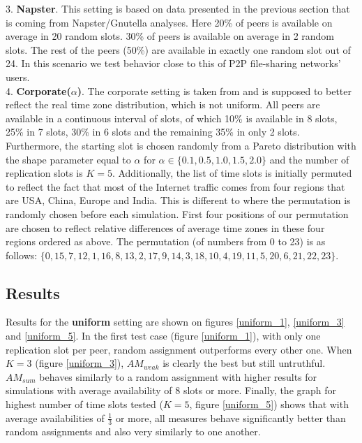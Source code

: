 \documentclass{pracamgren}
\begin{document}
3. {\bf Napster}. This setting is based on data presented in the previous section that is coming from Napster/Gnutella analyses. Here 20\% of peers is available on average in 20 random slots. 30\% of peers is available on average in 2 random slots. The rest of the peers (50\%) are available in exactly one random slot out of 24. In this scenario we test behavior close to this of P2P file-sharing networks' users.\\

4. {\bf Corporate($\alpha$)}. The corporate setting is taken from \cite{krz} and is supposed to better reflect the real time zone distribution, which is not uniform. All peers are available in a continuous interval of slots, of which 10\% is available in 8 slots, 25\%  in 7 slots, 30\% in 6 slots and the remaining 35\% in only 2 slots. Furthermore, the starting slot is chosen randomly from a Pareto distribution with the shape parameter equal to $\alpha$ for $\alpha \in \{0.1, 0.5, 1.0, 1.5, 2.0\}$ and the number of replication slots is $K=5$. Additionally, the list of time slots is initially permuted to reflect the fact that most of the Internet traffic comes from four regions that are USA, China, Europe and India. This is different to \cite{krz} where the permutation is randomly chosen before each simulation. First four positions of our permutation are chosen to reflect relative differences of average time zones in these four regions ordered as above. The permutation (of numbers from 0 to 23) is as follows: $\{ 0, 15, 7, 12, 1, 16, 8, 13, 2, 17, 9, 14, 3, 18, 10, 4, 19, 11, 5, 20, 6, 21, 22, 23\}$.\\

\subsection{Results}

Results for the {\bf uniform} setting are shown on figures \ref{uniform_1}, \ref{uniform_3} and \ref{uniform_5}. In the first test case (figure \ref{uniform_1}), with only one replication slot per peer, random assignment outperforms every other one. When $K=3$ (figure \ref{uniform_3}), $AM_{weak}$ is clearly the best but still untruthful. $AM_{sum}$ behaves similarly to a random assignment with higher results for simulations with average availability of 8 slots or more. Finally, the graph for highest number of time slots tested ($K=5$, figure \ref{uniform_5}) shows that with average availabilities of $\frac{1}{3}$ or more, all measures behave significantly better than random assignments and also very similarly to one another.\\
\end{document}
